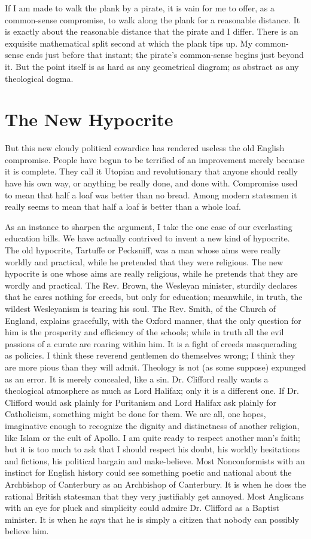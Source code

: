 \documentclass{book}
\begin{document}
If I am made to walk the plank by a pirate, it is vain for me to offer, as a common-sense compromise, to walk along the plank for a reasonable distance. It is exactly about the reasonable distance that the pirate and I differ. There is an exquisite mathematical split second at which the plank tips up. My common-sense ends just before that instant; the pirate’s common-sense begins just beyond it. But the point itself is as hard as any geometrical diagram; as abstract as any theological dogma.

\chapter{The New Hypocrite}
\label{chapter-4}
But this new cloudy political cowardice has rendered useless the old English compromise. People have begun to be terrified of an improvement merely because it is complete. They call it Utopian and revolutionary that anyone should really have his own way, or anything be really done, and done with. Compromise used to mean that half a loaf was better than no bread. Among modern statesmen it really seems to mean that half a loaf is better than a whole loaf.

As an instance to sharpen the argument, I take the one case of our everlasting education bills. We have actually contrived to invent a new kind of hypocrite. The old hypocrite, Tartuffe or Pecksniff, was a man whose aims were really worldly and practical, while he pretended that they were religious. The new hypocrite is one whose aims are really religious, while he pretends that they are wordly and practical. The Rev. Brown, the Wesleyan minister, sturdily declares that he cares nothing for creeds, but only for education; meanwhile, in truth, the wildest Wesleyanism is tearing his soul. The Rev. Smith, of the Church of England, explains gracefully, with the Oxford manner, that the only question for him is the prosperity and efficiency of the schools; while in truth all the evil passions of a curate are roaring within him. It is a fight of creeds masquerading as policies. I think these reverend gentlemen do themselves wrong; I think they are more pious than they will admit. Theology is not (as some suppose) expunged as an error. It is merely concealed, like a sin. Dr. Clifford really wants a theological atmosphere as much as Lord Halifax; only it is a different one. If Dr. Clifford would ask plainly for Puritanism and Lord Halifax ask plainly for Catholicism, something might be done for them. We are all, one hopes, imaginative enough to recognize the dignity and distinctness of another religion, like Islam or the cult of Apollo. I am quite ready to respect another man’s faith; but it is too much to ask that I should respect his doubt, his worldly hesitations and fictions, his political bargain and make-believe. Most Nonconformists with an instinct for English history could see something poetic and national about the Archbishop of Canterbury as an Archbishop of Canterbury. It is when he does the rational British statesman that they very justifiably get annoyed. Most Anglicans with an eye for pluck and simplicity could admire Dr. Clifford as a Baptist minister. It is when he says that he is simply a citizen that nobody can possibly believe him.
\end{document}
